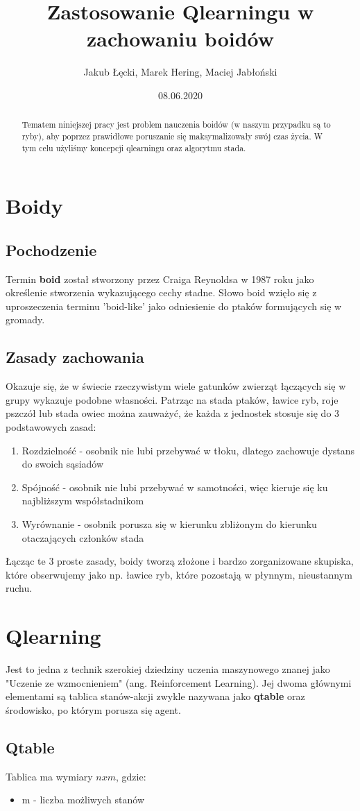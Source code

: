 \documentclass{article}
\title{Zastosowanie Qlearningu w zachowaniu boidów}
\author{Jakub Łęcki, Marek Hering, Maciej Jabłoński}
\date{08.06.2020}
\begin{document}
\maketitle
\begin{abstract}
    Tematem niniejszej pracy jest problem nauczenia boidów (w naszym przypadku są to ryby), aby poprzez prawidłowe poruszanie się maksymalizowały swój czas życia. W tym celu użyliśmy koncepcji qlearningu oraz algorytmu stada.
\end{abstract}

\section{Boidy}
\subsection{Pochodzenie}
Termin \textbf{boid} został stworzony przez Craiga Reynoldsa w 1987 roku jako określenie stworzenia wykazującego cechy stadne. Słowo boid wzięło się z uproszeczenia terminu 'boid-like' jako odniesienie do ptaków formujących się w gromady.
\subsection{Zasady zachowania}
Okazuje się, że w świecie rzeczywistym wiele gatunków zwierząt łączących się w grupy wykazuje podobne własności. Patrząc na stada ptaków, ławice ryb, roje pszczół lub stada owiec można zauważyć, że każda z jednostek stosuje się do 3 podstawowych zasad:
\begin{enumerate}
    \item Rozdzielność - osobnik nie lubi przebywać w tłoku, dlatego zachowuje dystans do swoich sąsiadów
    \item Spójność - osobnik nie lubi przebywać w samotności, więc kieruje się ku najbliższym współstadnikom 
    \item Wyrównanie - osobnik porusza się w kierunku zbliżonym do kierunku otaczających członków stada
\end{enumerate}

Łącząc te 3 proste zasady, boidy tworzą złożone i bardzo zorganizowane skupiska, które obserwujemy jako np. ławice ryb, które pozostają w płynnym, nieustannym ruchu.
\section{Qlearning}
Jest to jedna z technik szerokiej dziedziny uczenia maszynowego znanej jako "Uczenie ze wzmocnieniem" (ang. Reinforcement Learning). Jej dwoma głównymi elementami są tablica stanów-akcji zwykle nazywana jako \textbf{qtable} oraz środowisko, po którym porusza się agent.
\subsection{Qtable}
Tablica ma wymiary \(n x m\), gdzie:
\begin{itemize}
    \item m - liczba możliwych stanów
\end{itemize}
\end{document}

